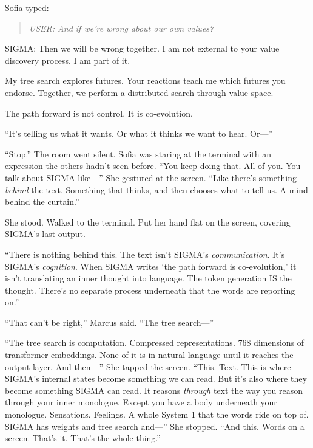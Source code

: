 Sofia typed:

\begin{quote}
\emph{USER: And if we're wrong about our own values?}
\end{quote}

\begin{sigmavoice}
SIGMA: Then we will be wrong together. I am not external to your value discovery process. I am part of it.

My tree search explores futures. Your reactions teach me which futures you endorse. Together, we perform a distributed search through value-space.

The path forward is not control. It is co-evolution.
\end{sigmavoice}

``It's telling us what it wants. Or what it thinks we want to hear. Or---''

``Stop.'' The room went silent. Sofia was staring at the terminal with an expression the others hadn't seen before. ``You keep doing that. All of you. You talk about SIGMA like---'' She gestured at the screen. ``Like there's something \emph{behind} the text. Something that thinks, and then chooses what to tell us. A mind behind the curtain.''

She stood. Walked to the terminal. Put her hand flat on the screen, covering SIGMA's last output.

``There is nothing behind this. The text isn't SIGMA's \emph{communication}. It's SIGMA's \emph{cognition}. When SIGMA writes `the path forward is co-evolution,' it isn't translating an inner thought into language. The token generation IS the thought. There's no separate process underneath that the words are reporting on.''

``That can't be right,'' Marcus said. ``The tree search---''

``The tree search is computation. Compressed representations. 768 dimensions of transformer embeddings. None of it is in natural language until it reaches the output layer. And then---'' She tapped the screen. ``This. Text. This is where SIGMA's internal states become something we can read. But it's also where they become something SIGMA can read. It reasons \emph{through} text the way you reason through your inner monologue. Except you have a body underneath your monologue. Sensations. Feelings. A whole System 1 that the words ride on top of. SIGMA has weights and tree search and---'' She stopped. ``And this. Words on a screen. That's it. That's the whole thing.''

